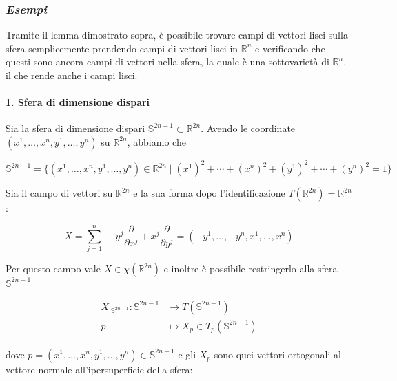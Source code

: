 \subsubsection{\textit{Esempi}}

Tramite il lemma dimostrato sopra, è possibile trovare campi di vettori lisci sulla sfera semplicemente prendendo campi di vettori lisci in $ \mathbb{R}^{n} $ e verificando che questi sono ancora campi di vettori nella sfera, la quale è una sottovarietà di $ \mathbb{R}^{n} $, il che rende anche i campi lisci.

\paragraph{1. Sfera di dimensione dispari}

Sia la sfera di dimensione dispari $ \mathbb{S}^{2n-1} \subset \mathbb{R}^{2n} $. Avendo le coordinate $ (x^{1},\dots,x^{n},y^{1},\dots,y^{n}) $ su $ \mathbb{R}^{2n} $, abbiamo che

\begin{equation}
	\mathbb{S}^{2n-1} = \{ (x^{1},\dots,x^{n},y^{1},\dots,y^{n}) \in \mathbb{R}^{2n} \mid (x^{1})^{2} + \cdots + (x^{n})^{2} + (y^{1})^{2} + \cdots + (y^{n})^{2} = 1 \}
\end{equation}

Sia il campo di vettori su $ \mathbb{R}^{2n} $ e la sua forma dopo l'identificazione $ T(\mathbb{R}^{2n}) = \mathbb{R}^{2n} $:

\begin{equation}
	X = \sum_{j=1}^{n} - y^{j} \dfrac{\partial}{\partial x^{j}} + x^{j} \dfrac{\partial}{\partial y^{j}} = (-y^{1},\dots,-y^{n},x^{1},\dots,x^{n})
\end{equation}

Per questo campo vale $ X \in \chi(\mathbb{R}^{2n}) $ e inoltre è possibile restringerlo alla sfera $ \mathbb{S}^{2n-1} $

\begin{align}
	\begin{split}
		X_{|\mathbb{S}^{2n-1}} : \mathbb{S}^{2n-1} &\to T(\mathbb{S}^{2n-1})\\
		p &\mapsto X_{p} \in T_{p}(\mathbb{S}^{2n-1})
	\end{split}
\end{align}

dove $ p = (x^{1},\dots,x^{n},y^{1},\dots,y^{n}) \in \mathbb{S}^{2n-1} $ e gli $ X_{p} $ sono quei vettori ortogonali al vettore normale all'ipersuperficie della sfera:

